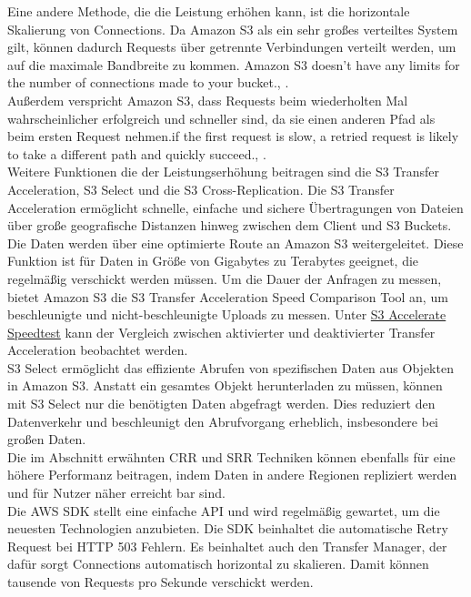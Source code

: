 Eine andere Methode, die die Leistung erhöhen kann, ist die horizontale Skalierung von Connections. Da Amazon S3 als ein sehr großes verteiltes System gilt, können dadurch Requests über getrennte Verbindungen verteilt werden, um auf die maximale Bandbreite zu kommen. \glqq Amazon S3 doesn't have any limits for the number of connections made to your bucket.\grqq, \cite{performance-guide}.\\Außerdem verspricht Amazon S3, dass Requests beim wiederholten Mal wahrscheinlicher erfolgreich und schneller sind, da sie einen anderen Pfad als beim ersten Request nehmen.\glqq[...] if the first request is slow, a retried request is likely to take a different path and quickly succeed.\grqq, \cite{performance-guide}.\\

Weitere Funktionen die der Leistungserhöhung beitragen sind die S3 Transfer Acceleration, S3 Select und die S3 Cross-Replication. Die S3 Transfer Acceleration ermöglicht schnelle, einfache und sichere Übertragungen von Dateien über große geografische Distanzen hinweg zwischen dem Client und S3 Buckets. Die Daten werden über eine optimierte Route an Amazon S3 weitergeleitet. Diese Funktion ist für Daten in Größe von Gigabytes zu Terabytes geeignet, die regelmäßig verschickt werden müssen. Um die Dauer der Anfragen zu messen, bietet Amazon S3 die S3 Transfer Acceleration Speed Comparison Tool an, um beschleunigte und nicht-beschleunigte Uploads zu messen. Unter \href{https://s3-accelerate-speedtest.s3-accelerate.amazonaws.com/en/accelerate-speed-comparsion.html}{S3 Accelerate Speedtest} kann der Vergleich zwischen aktivierter und deaktivierter Transfer Acceleration beobachtet werden.\\

S3 Select ermöglicht das effiziente Abrufen von spezifischen Daten aus Objekten in Amazon S3. Anstatt ein gesamtes Objekt herunterladen zu müssen, können mit S3 Select nur die benötigten Daten abgefragt werden. Dies reduziert den Datenverkehr und beschleunigt den Abrufvorgang erheblich, insbesondere bei großen Daten.\\

Die im Abschnitt erwähnten CRR und SRR Techniken können ebenfalls für eine höhere Performanz beitragen, indem Daten in andere Regionen repliziert werden und für Nutzer näher erreicht bar sind.\\

Die AWS SDK stellt eine einfache API und wird regelmäßig gewartet, um die neuesten Technologien anzubieten. Die SDK beinhaltet die automatische Retry Request bei HTTP 503 Fehlern. Es beinhaltet auch den Transfer Manager, der dafür sorgt Connections automatisch horizontal zu skalieren. Damit können tausende von Requests pro Sekunde verschickt werden.

